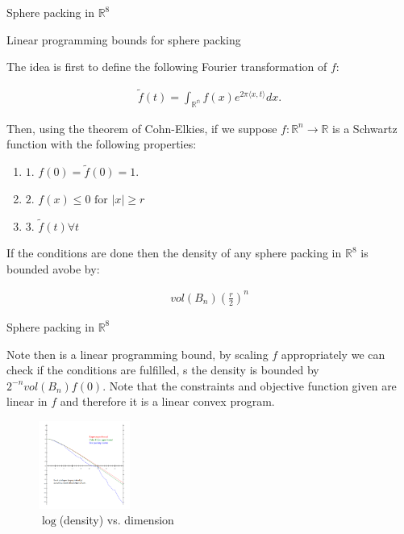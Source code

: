 \documentclass[10pt]{beamer}
\begin{document}
\begin{frame}{Sphere packing in $\mathbb{R}^8$}

\begin{block}{Linear programming bounds for sphere packing}
    
    The idea is first to define the following Fourier transformation of $f$:

  \begin{equation} \label{6.4}
    \begin{split}
        \tilde{f}(t) = \int_{\mathbb{R^n}} f(x)e^{2 \pi \langle x, t \rangle} dx.
    \end{split}
    \end{equation}
    
    Then, using the theorem of Cohn-Elkies, if we suppose $f: \mathbb{R}^n \rightarrow \mathbb{R}$ is a Schwartz function with the following properties:
    
    
    \begin{enumerate}
    \item $\text{1. } f(0) = \tilde{f}(0) = 1.$
    \item $\text{2. } f(x) \leq 0 \text{ for } |x| \geq r$
    \item $\text{3. } \tilde{f}(t) \forall t$
\end{enumerate}

If the conditions are done then the density of any sphere packing in $\mathbb{R}^8$ is bounded avobe by: 

\begin{equation} \label{6.4}
    \begin{split}
        vol(B_n)(\frac{r}{2})^n
    \end{split}
    \end{equation}
    
    \end{block}
    
    

\end{frame}


\begin{frame}{Sphere packing in $\mathbb{R}^8$}

Note then is a linear programming bound, by scaling $f$ appropriately we can check if the conditions are fulfilled, s the density is bounded by $2^{-n}vol(B_n)f(0)$. Note that the constraints and objective function given are linear in $f$ and therefore it is a linear convex program. 

    \begin{figure}[t]
    \includegraphics[width=3cm]{maplog.png}
    \centering
    \caption{$\log$(density) vs. dimension}
    \end{figure}


    
    

\end{frame}
\end{document}
